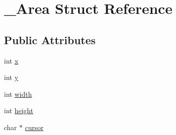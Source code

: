\hypertarget{struct__Area}{\section{\+\_\+\+Area Struct Reference}
\label{struct__Area}
}
\subsection*{Public Attributes}
\begin{DoxyCompactItemize}
\item 
int \hyperlink{struct__Area_a093b8c2929094bac88bbf5ee7db85573}{x}
\item 
int \hyperlink{struct__Area_a867e601f05480db03237c3a17d4c77f8}{y}
\item 
int \hyperlink{struct__Area_aa2f753fc3d254821603ac4512db814f1}{width}
\item 
int \hyperlink{struct__Area_a22627de8e529d631c17157f1f68cb5ac}{height}
\item 
char $\ast$ \hyperlink{struct__Area_aa042b0549789b75fd133b67ad7d0fd9d}{cursor}
\end{DoxyCompactItemize}


